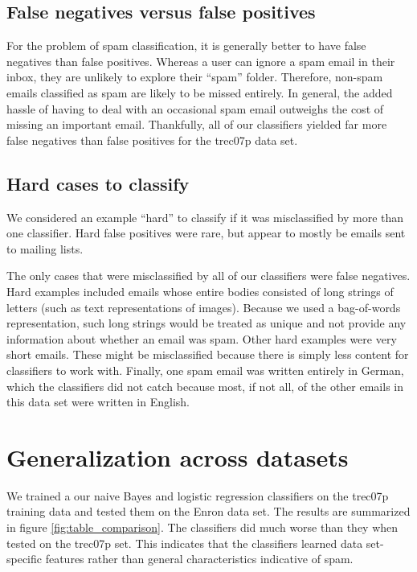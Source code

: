 \documentclass{article} %
\begin{document}
\subsection{False negatives versus false positives}
For the problem of spam classification, it is generally better to have false negatives than false positives. Whereas a user can ignore a spam email in their inbox, they are unlikely to explore their ``spam'' folder. Therefore, non-spam emails classified as spam are likely to be missed entirely. In general, the added hassle of having to deal with an occasional spam email outweighs the cost of missing an important email. Thankfully, all of our classifiers yielded far more false negatives than false positives for the trec07p data set.

\subsection{Hard cases to classify}
We considered an example ``hard'' to classify if it was misclassified by more than one classifier. Hard false positives were rare, but appear to mostly be emails sent to mailing lists.

The only cases that were misclassified by all of our classifiers were false negatives. Hard examples included emails whose entire bodies consisted of long strings of letters (such as text representations of images). Because we used a bag-of-words representation, such long strings would be treated as unique and not provide any information about whether an email was spam. Other hard examples were very short emails. These might be misclassified because there is simply less content for classifiers to work with. Finally, one spam email was written entirely in German, which the classifiers did not catch because most, if not all, of the other emails in this data set were written in English. 

\section{Generalization across datasets}
We trained a our naive Bayes and logistic regression classifiers on the trec07p training data and tested them on the Enron data set. The results are summarized in figure \ref{fig:table_comparison}. The classifiers did much worse than they when tested on the trec07p set. This indicates that the classifiers learned data set-specific features rather than general characteristics indicative of spam. 
\end{document}
